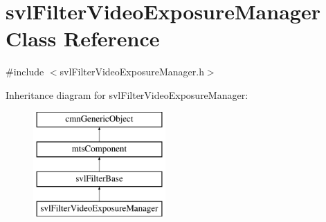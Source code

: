 \hypertarget{classsvl_filter_video_exposure_manager}{\section{svl\-Filter\-Video\-Exposure\-Manager Class Reference}
\label{classsvl_filter_video_exposure_manager}
}


{\ttfamily \#include $<$svl\-Filter\-Video\-Exposure\-Manager.\-h$>$}

Inheritance diagram for svl\-Filter\-Video\-Exposure\-Manager\-:\begin{figure}[H]
\begin{center}
\leavevmode
\includegraphics[height=4.000000cm]{d9/d7a/classsvl_filter_video_exposure_manager}
\end{center}
\end{figure}
